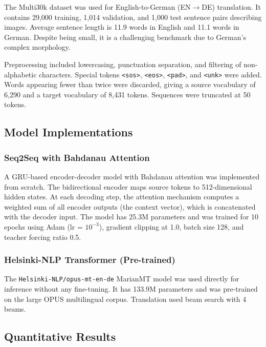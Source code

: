 \documentclass[12pt,a4paper]{article}
\begin{document}
The Multi30k dataset \cite{elliott2016multi30k} was used for
English-to-German (EN$\rightarrow$DE) translation. It contains 29{,}000
training, 1{,}014 validation, and 1{,}000 test sentence pairs describing
images. Average sentence length is 11.9 words in English and 11.1 words in
German. Despite being small, it is a challenging benchmark due to German's
complex morphology.

Preprocessing included lowercasing, punctuation separation, and filtering
of non-alphabetic characters. Special tokens \texttt{<sos>}, \texttt{<eos>},
\texttt{<pad>}, and \texttt{<unk>} were added. Words appearing fewer than
twice were discarded, giving a source vocabulary of 6{,}290 and a target
vocabulary of 8{,}431 tokens. Sequences were truncated at 50 tokens.

\subsection{Model Implementations}

\subsubsection{Seq2Seq with Bahdanau Attention}

A GRU-based encoder-decoder model with Bahdanau attention
\cite{bahdanau2015attention} was implemented from scratch. The bidirectional
encoder maps source tokens to 512-dimensional hidden states. At each decoding
step, the attention mechanism computes a weighted sum of all encoder outputs
(the context vector), which is concatenated with the decoder input. The model
has 25.3M parameters and was trained for 10 epochs using Adam
(lr = $10^{-3}$), gradient clipping at 1.0, batch size 128, and teacher
forcing ratio 0.5.

\subsubsection{Helsinki-NLP Transformer (Pre-trained)}

The \texttt{Helsinki-NLP/opus-mt-en-de} MarianMT model \cite{vaswani2017transformer}
was used directly for inference without any fine-tuning. It has 133.9M
parameters and was pre-trained on the large OPUS multilingual corpus.
Translation used beam search with 4 beams.

\subsection{Quantitative Results}
\end{document}
